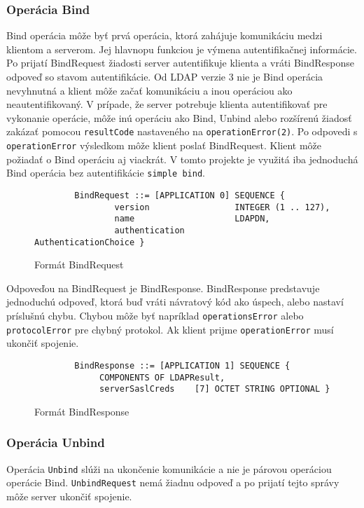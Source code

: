 \documentclass[11pt,a4paper]{article}
\begin{document}
\subsubsection{Operácia Bind}
Bind operácia môže byť prvá operácia, ktorá zahájuje komunikáciu medzi klientom a serverom. Jej hlavnopu funkciou je výmena autentifikačnej informácie. Po prijatí BindRequest žiadosti  server autentifikuje klienta a vráti BindResponse odpoveď so stavom autentifikácie. Od LDAP verzie 3 nie je Bind operácia nevyhnutná a klient môže začať komunikáciu a inou operáciou ako neautentifikovaný. V prípade, že server potrebuje klienta autentifikovať pre vykonanie operácie, môže inú operáciu ako Bind, Unbind alebo rozšírenú žiadosť zakázať pomocou \texttt{resultCode} nastaveného na \texttt{operationError(2)}. Po odpovedi s \texttt{operationError} výsledkom môže klient poslať BindRequest.  Klient môže požiadať o Bind operáciu aj viackrát. V tomto projekte je využitá iba jednoduchá Bind operácia bez autentifikácie \texttt{simple bind}.\\

\begin{figure}[H]
\begin{verbatim}
        BindRequest ::= [APPLICATION 0] SEQUENCE {
                version                 INTEGER (1 .. 127),
                name                    LDAPDN,
                authentication          AuthenticationChoice }
\end{verbatim}
\caption{Formát BindRequest}
\end{figure}

Odpoveďou na BindRequest je BindResponse. BindResponse predstavuje jednoduchú odpoveď, ktorá buď vráti návratový kód ako úspech, alebo nastaví príslušnú chybu. Chybou môže byť napríklad \texttt{operationsError} alebo \texttt{protocolError} pre chybný protokol. Ak klient prijme \texttt{operationError} musí ukončiť spojenie.\\

\begin{figure}[H]
\begin{verbatim}
        BindResponse ::= [APPLICATION 1] SEQUENCE {
             COMPONENTS OF LDAPResult,
             serverSaslCreds    [7] OCTET STRING OPTIONAL }
\end{verbatim}
\caption{Formát BindResponse}
\end{figure}

\subsubsection{Operácia Unbind}
Operácia \texttt{Unbind} slúži na ukončenie komunikácie a nie je párovou operáciou operácie Bind. \texttt{UnbindRequest} nemá žiadnu odpoveď a po prijatí tejto správy môže server ukončiť spojenie.
\end{document}
